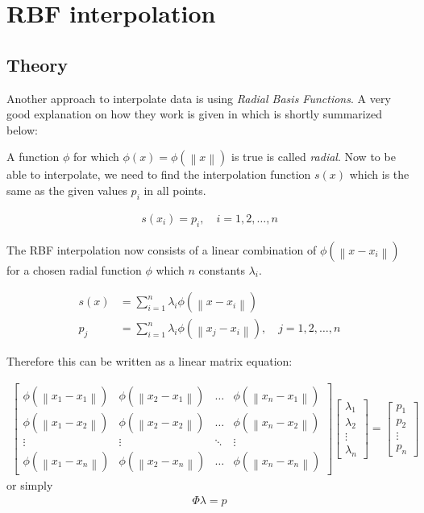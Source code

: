 \section{RBF interpolation}

\subsection{Theory}

Another approach to interpolate data is using \textit{Radial Basis Functions}. A very good explanation on how they work is given in \cite{RBF} which is shortly summarized below:

 A function $\phi$ for which $\phi(x)=\phi(\left\|x\right\|)$ is true is called \textit{radial}. Now to be able to interpolate, we need to find the interpolation function $s(x)$ which is the same as the given values $p_i$ in all points.

\begin{align}
	s(x_i)=p_i,\quad i=1,2,\dots,n
\end{align}

The RBF interpolation now consists of a linear combination of $\phi(\left\|x-x_i\right\|)$ for a chosen radial function $\phi$ which $n$ constants $\lambda_i$.

\begin{align}
	s(x)&=	\sum_{i=1}^{n}\lambda_i\phi(\left\|x-x_i\right\|) \\
	p_j&=\sum_{i=1}^{n}\lambda_i\phi(\left\|x_j-x_i\right\|),\quad j=1,2,\dots,n
\end{align}

Therefore this can be written as a linear matrix equation:

\begin{align}
	\begin{bmatrix}
		\phi(\left\|x_1-x_1\right\|) & \phi(\left\|x_2-x_1\right\|) & \dots  & \phi(\left\|x_n-x_1\right\|) \\
		\phi(\left\|x_1-x_2\right\|) & \phi(\left\|x_2-x_2\right\|) & \dots  & \phi(\left\|x_n-x_2\right\|) \\
		\vdots                       & \vdots                       & \ddots & \vdots                       \\
		\phi(\left\|x_1-x_n\right\|) & \phi(\left\|x_2-x_n\right\|) & \dots  & \phi(\left\|x_n-x_n\right\|)
	\end{bmatrix} 
	\begin{bmatrix}
		\lambda_1 \\
		\lambda_2 \\
		\vdots    \\
		\lambda_n
	\end{bmatrix}
	=
	\begin{bmatrix}
		p_1    \\
		p_2    \\
		\vdots \\
		p_n
	\end{bmatrix}
\end{align}
or simply
\begin{align}
	\Phi\lambda=p
\end{align}

